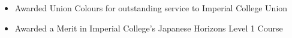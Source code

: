 \documentclass[11pt,a4paper,sans]{moderncv}        %
\begin{document}
\begin{itemize}

\item Awarded Union Colours for outstanding service to Imperial College Union

\item Awarded a Merit in Imperial College's Japanese Horizons Level 1 Course

\end{itemize}

\nocite{*}



\end{document}
